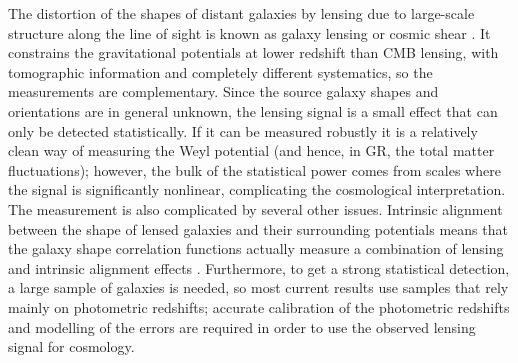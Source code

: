 \documentclass[longauth,traditabstract]{aa}
\begin{document}
The distortion of the shapes of distant galaxies by lensing due to large-scale structure along the line of sight is known as galaxy lensing or cosmic
shear \citep[see e.g.,][for a review]{Bartelmann:1999yn}.
It constrains the gravitational potentials at lower redshift than CMB lensing, with tomographic information and completely different systematics, so the measurements are complementary.
Since the source galaxy shapes and orientations
are in general unknown, the lensing signal is a small effect that can only be detected statistically. If it can be measured robustly it is a relatively clean way of measuring the Weyl potential (and hence, in GR, the
total matter fluctuations); however, the bulk of the statistical power comes from scales where the signal is significantly nonlinear, complicating the cosmological interpretation.
The measurement is also complicated by several other issues.
Intrinsic alignment between the shape of lensed galaxies and their surrounding potentials means that the galaxy shape correlation functions actually measure a combination of lensing and intrinsic alignment effects \citep{Hirata:2004gc}. Furthermore, to get a strong statistical detection, a large sample of galaxies is needed, so most current results use samples that rely mainly on photometric redshifts; accurate calibration of  the photometric redshifts and modelling of the errors are required in order to use the observed lensing signal for cosmology.
\end{document}
